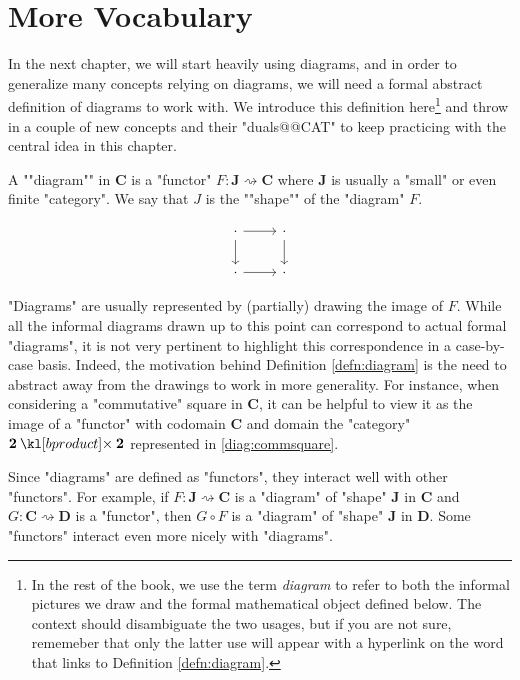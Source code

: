 \documentclass[main.tex]{subfiles}
\begin{document}
\section{More Vocabulary}
In the next chapter, we will start heavily using diagrams, and in order to generalize many concepts relying on diagrams, we will need a formal abstract definition of diagrams to work with. We introduce this definition here\footnote{In the rest of the book, we use the term \textit{diagram} to refer to both the informal pictures we draw and the formal mathematical object defined below. The context should disambiguate the two usages, but if you are not sure, rememeber that only the latter use will appear with a hyperlink on the word that links to Definition \ref{defn:diagram}.} and throw in a couple of new concepts and their "duals@@CAT" to keep practicing with the central idea in this chapter.
\begin{defn}[Diagram]\label{defn:diagram}
    \AP A ""diagram"" in $\mathbf{C}$ is a "functor" $F:\mathbf{J}\rightsquigarrow \mathbf{C}$ where $\mathbf{J}$ is usually a "small" or even finite "category". \AP We say that $J$ is the ""shape"" of the "diagram" $F$.
\end{defn}
\begin{rem}
\begin{marginfigure}[5\baselineskip]
    \begin{equation}\label{diag:commsquare}
        \begin{tikzcd}
            \cdot \arrow[r] \arrow[d] & \cdot \arrow[d] \\
            \cdot \arrow[r] & \cdot
        \end{tikzcd}
    \end{equation}
\end{marginfigure}
"Diagrams" are usually represented by (partially) drawing the image of $F$. While all the informal diagrams drawn up to this point can correspond to actual formal "diagrams", it is not very pertinent to highlight this correspondence in a case-by-case basis. Indeed, the motivation behind Definition \ref{defn:diagram} is the need to abstract away from the drawings to work in more generality. For instance, when considering a "commutative" square in $\mathbf{C}$, it can be helpful to view it as the image of a "functor" with codomain $\mathbf{C}$ and domain the "category" $\mathbf{2}\product \mathbf{2}$ represented in \eqref{diag:commsquare}.
\end{rem}
Since "diagrams" are defined as "functors", they interact well with other "functors". For example, if $F: \mathbf{J} \rightsquigarrow \mathbf{C}$ is a "diagram" of "shape" $\mathbf{J}$ in $\mathbf{C}$ and $G: \mathbf{C}\rightsquigarrow \mathbf{D}$ is a "functor", then $G\circ F$ is a "diagram" of "shape" $\mathbf{J}$ in $\mathbf{D}$. Some "functors" interact even more nicely with "diagrams".
\end{document}
